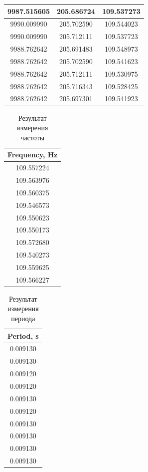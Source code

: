 \documentclass[a4paper,14pt]{article}
\begin{document}
\begin{longtable}[c]{|c|c|c|}
	9987.515605       & 205.686724           & 109.537273        \\ \hline
	9990.009990       & 205.702590           & 109.544023        \\ \hline
	9990.009990       & 205.712111           & 109.537723        \\ \hline
	9988.762642       & 205.691483           & 109.548973        \\ \hline
	9988.762642       & 205.702590           & 109.541623        \\ \hline
	9988.762642       & 205.712111           & 109.530975        \\ \hline
	9988.762642       & 205.716343           & 109.528425        \\ \hline
	9988.762642       & 205.697301           & 109.541923        \\ \hline
\end{longtable}

\begin{table}[H]
	\centering
	\caption{Результат измерения частоты}
	\label{tab:dfm_scan_freq}
	\begin{tabular}{|c|}
		\hline
		Frequency, Hz \\ \hline
		 109.557224   \\ \hline
		 109.563976   \\ \hline
		 109.560375   \\ \hline
		 109.546573   \\ \hline
		 109.550623   \\ \hline
		 109.550173   \\ \hline
		 109.572680   \\ \hline
		 109.540273   \\ \hline
		 109.559625   \\ \hline
		 109.566227   \\ \hline
	\end{tabular}
\end{table}

\begin{table}[H]
	\centering
	\caption{Результат измерения периода}
	\label{tab:dfm_scan_period}
	\begin{tabular}{|c|}
		\hline
		Period, s \\ \hline
		0.009130  \\ \hline
		0.009130  \\ \hline
		0.009120  \\ \hline
		0.009120  \\ \hline
		0.009130  \\ \hline
		0.009120  \\ \hline
		0.009130  \\ \hline
		0.009130  \\ \hline
		0.009130  \\ \hline
		0.009130  \\ \hline
	\end{tabular}
\end{table}
\end{document}

